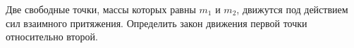 Две свободные точки, массы которых равны $m_1$ и $m_2$, движутся под
действием сил взаимного притяжения. Определить закон движения первой
точки относительно второй.
